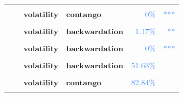 \documentclass[
  authoryear,
  preprint,
  3p]{elsarticle}
\begin{document}
\begin{longtable}[t]{>{}l>{}l>{}l>{}l>{}r>{}r}
\textbf{\cellcolor{gray!10}{}} & \textbf{\cellcolor{gray!10}{crisis}} & \textbf{\cellcolor{gray!10}{mean}} & \textbf{\cellcolor{gray!10}{contango}} & \textcolor[HTML]{4285f4}{\cellcolor{gray!10}{42.98\%}} & \textcolor[HTML]{4285f4}{\cellcolor{gray!10}{}}\\
\textbf{} & \textbf{} & \textbf{volatility} & \textbf{contango} & \textcolor[HTML]{4285f4}{0\%} & \textcolor[HTML]{4285f4}{\vphantom{27} ***}\\
\textbf{\cellcolor{gray!10}{}} & \textbf{\cellcolor{gray!10}{post-crisis}} & \textbf{\cellcolor{gray!10}{mean}} & \textbf{\cellcolor{gray!10}{contango}} & \textcolor[HTML]{4285f4}{\cellcolor{gray!10}{51.48\%}} & \textcolor[HTML]{4285f4}{\cellcolor{gray!10}{}}\\
\textbf{} & \textbf{} & \textbf{volatility} & \textbf{backwardation} & \textcolor[HTML]{4285f4}{1.17\%} & \textcolor[HTML]{4285f4}{**}\\
\addlinespace
\textbf{\cellcolor{gray!10}{Coffee-C (IFUS)}} & \textbf{\cellcolor{gray!10}{past}} & \textbf{\cellcolor{gray!10}{mean}} & \textbf{\cellcolor{gray!10}{backwardation}} & \textcolor[HTML]{4285f4}{\cellcolor{gray!10}{53.38\%}} & \textcolor[HTML]{4285f4}{\cellcolor{gray!10}{}}\\
\textbf{} & \textbf{} & \textbf{volatility} & \textbf{backwardation} & \textcolor[HTML]{4285f4}{0\%} & \textcolor[HTML]{4285f4}{\vphantom{2} ***}\\
\textbf{\cellcolor{gray!10}{}} & \textbf{\cellcolor{gray!10}{financialisation}} & \textbf{\cellcolor{gray!10}{mean}} & \textbf{\cellcolor{gray!10}{backwardation}} & \textcolor[HTML]{4285f4}{\cellcolor{gray!10}{69.3\%}} & \textcolor[HTML]{4285f4}{\cellcolor{gray!10}{}}\\
\textbf{} & \textbf{} & \textbf{volatility} & \textbf{backwardation} & \textcolor[HTML]{4285f4}{51.63\%} & \textcolor[HTML]{4285f4}{}\\
\textbf{\cellcolor{gray!10}{}} & \textbf{\cellcolor{gray!10}{crisis}} & \textbf{\cellcolor{gray!10}{mean}} & \textbf{\cellcolor{gray!10}{backwardation}} & \textcolor[HTML]{4285f4}{\cellcolor{gray!10}{95.23\%}} & \textcolor[HTML]{4285f4}{\cellcolor{gray!10}{}}\\
\addlinespace
\textbf{} & \textbf{} & \textbf{volatility} & \textbf{contango} & \textcolor[HTML]{4285f4}{82.84\%} & \textcolor[HTML]{4285f4}{}\\
\textbf{\cellcolor{gray!10}{}} & \textbf{\cellcolor{gray!10}{post-crisis}} & \textbf{\cellcolor{gray!10}{mean}} & \textbf{\cellcolor{gray!10}{backwardation}} & \textcolor[HTML]{4285f4}{\cellcolor{gray!10}{35.39\%}} & \textcolor[HTML]{4285f4}{\cellcolor{gray!10}{}}\\

\end{longtable}
\end{document}
